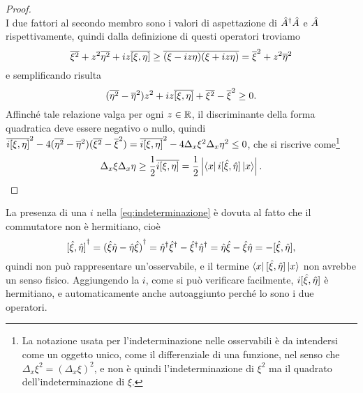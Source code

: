 \begin{proof}
\begin{equation}
	\end{equation}
	I due fattori al secondo membro sono i valori di aspettazione di ${\hat{A}}^\dagger\hat{A}$	e $\hat{A}$ rispettivamente, quindi dalla definizione di questi operatori troviamo
	\begin{equation}
		\overline{\xi^2}+z^2\overline{\eta^2}+iz\overline{[\xi,\eta]}\geq\overline{(\xi-iz\eta)}\overline{(\xi+iz\eta)}=\overline{\xi}^2+z^2\overline{\eta}^2
	\end{equation}
	e semplificando risulta
	\begin{equation}
		(\overline{\eta^2}-\overline{\eta}^2)z^2+iz\overline{[\xi,\eta]}+\overline{\xi^2}-\overline{\xi}^2\geq 0.
	\end{equation}
	Affinch\'e tale relazione valga per ogni $z\in\mathbb{R}$, il discriminante della forma quadratica deve essere negativo o nullo, quindi $\overline{i[\xi,\eta]}^2-4(\overline{\eta^2}-\overline{\eta}^2)(\overline{\xi^2}-\overline{\xi}^2)=\overline{i[\xi,\eta]}^2-4\Delta_x\xi^2\Delta_x\eta^2\leq 0$, che si riscrive come\footnote{La notazione usata per l'indeterminazione nelle osservabili è da intendersi come un oggetto unico, come il differenziale di una funzione, nel senso che $\Delta_x\xi^2=(\Delta_x\xi)^2$, e non è quindi l'indeterminazione di $\xi^2$ ma il quadrato dell'indeterminazione di $\xi$.}
	\begin{equation}
		\Delta_x\xi\Delta_x\eta\geq\frac12\overline{i[\xi,\eta]}=\frac12\left|{\left\langle{x}\right|i[\hat{\xi},\hat{\eta}]\left|{x}\right\rangle}\right|.
	\end{equation}
\end{proof}
La presenza di una $i$ nella \eqref{eq:indeterminazione} è dovuta al fatto che il commutatore non è hermitiano, cioè
\begin{equation}
	{[\hat{\xi},\hat{\eta}]}^\dagger={(\hat{\xi}\hat{\eta}-\hat{\eta}\hat{\xi})}^\dagger={\hat{\eta}}^\dagger{\hat{\xi}}^\dagger-{\hat{\xi}}^\dagger{\hat{\eta}}^\dagger=\hat{\eta}\hat{\xi}-\hat{\xi}\hat{\eta}=-[\hat{\xi},\hat{\eta}],
	\label{eq:commutatore-antihermitiano}
\end{equation}
quindi non può rappresentare un'osservabile, e il termine $\left\langle{x}\right|[\hat{\xi},\hat{\eta}]\left|{x}\right\rangle$ non avrebbe un senso fisico.
Aggiungendo la $i$, come si può verificare facilmente, $i[\hat{\xi},\hat{\eta}]$ è hermitiano, e automaticamente anche autoaggiunto perch\'e lo sono i due operatori.

